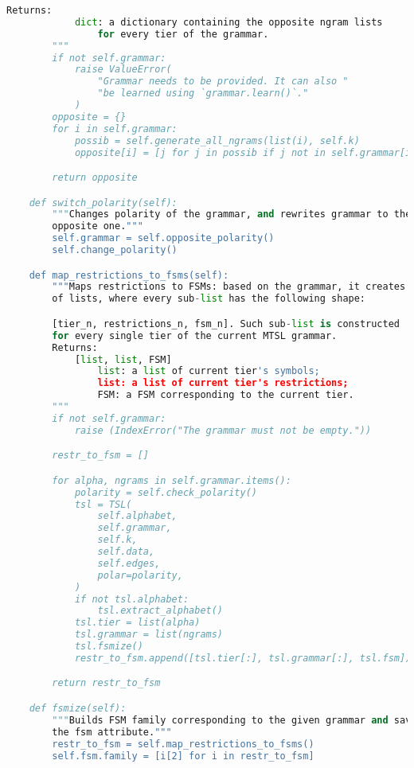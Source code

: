 \begin{lstlisting}[language=Python]
        Returns:
            dict: a dictionary containing the opposite ngram lists
                for every tier of the grammar.
        """
        if not self.grammar:
            raise ValueError(
                "Grammar needs to be provided. It can also "
                "be learned using `grammar.learn()`."
            )
        opposite = {}
        for i in self.grammar:
            possib = self.generate_all_ngrams(list(i), self.k)
            opposite[i] = [j for j in possib if j not in self.grammar[i]]

        return opposite

    def switch_polarity(self):
        """Changes polarity of the grammar, and rewrites grammar to the
        opposite one."""
        self.grammar = self.opposite_polarity()
        self.change_polarity()

    def map_restrictions_to_fsms(self):
        """Maps restrictions to FSMs: based on the grammar, it creates a list
        of lists, where every sub-list has the following shape:

        [tier_n, restrictions_n, fsm_n]. Such sub-list is constructed
        for every single tier of the current MTSL grammar.
        Returns:
            [list, list, FSM]
                list: a list of current tier's symbols;
                list: a list of current tier's restrictions;
                FSM: a FSM corresponding to the current tier.
        """
        if not self.grammar:
            raise (IndexError("The grammar must not be empty."))

        restr_to_fsm = []

        for alpha, ngrams in self.grammar.items():
            polarity = self.check_polarity()
            tsl = TSL(
                self.alphabet,
                self.grammar,
                self.k,
                self.data,
                self.edges,
                polar=polarity,
            )
            if not tsl.alphabet:
                tsl.extract_alphabet()
            tsl.tier = list(alpha)
            tsl.grammar = list(ngrams)
            tsl.fsmize()
            restr_to_fsm.append([tsl.tier[:], tsl.grammar[:], tsl.fsm])

        return restr_to_fsm

    def fsmize(self):
        """Builds FSM family corresponding to the given grammar and saves in it
        the fsm attribute."""
        restr_to_fsm = self.map_restrictions_to_fsms()
        self.fsm.family = [i[2] for i in restr_to_fsm]


\end{lstlisting}
